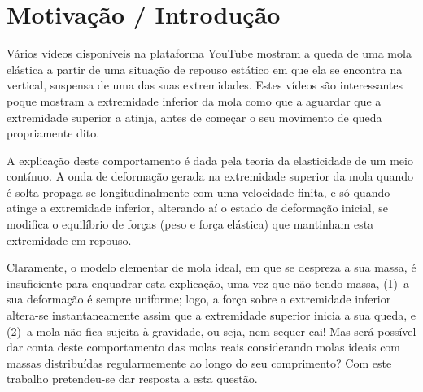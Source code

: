 \documentclass{article}
\begin{document}
\section*{Motivação / Introdução}
  Vários vídeos disponíveis na plataforma YouTube mostram a queda de uma mola
  elástica a partir de uma situação de repouso estático em que ela se encontra
  na vertical, suspensa de uma das suas extremidades. Estes vídeos são
  interessantes poque mostram a extremidade inferior da mola como que a aguardar
  que a extremidade superior a atinja, antes de começar o seu movimento de queda
  propriamente dito. 
	
  A explicação deste comportamento é dada pela teoria da elasticidade de um meio
  contínuo. A onda de deformação gerada na extremidade superior da mola quando é
  solta propaga-se longitudinalmente com uma velocidade finita, e só quando
  atinge a extremidade inferior, alterando aí o estado de deformação inicial, se
  modifica o equilíbrio de forças (peso e força elástica) que mantinham esta
  extremidade em repouso.
	
  Claramente, o modelo elementar de mola ideal, em que se despreza a sua massa,
  é insuficiente para enquadrar esta explicação, uma vez que não tendo massa,
  (1)~a sua deformação é sempre uniforme; logo, a força sobre a extremidade
  inferior altera-se instantaneamente assim que a extremidade superior inicia a
  sua queda, e (2)~a mola não fica sujeita à gravidade, ou seja, nem sequer cai!
  Mas será possível dar conta deste comportamento das molas reais considerando
  molas ideais com massas distribuídas regularmemente ao longo do seu
  comprimento? Com este trabalho pretendeu-se dar resposta a esta questão.
\end{document}
